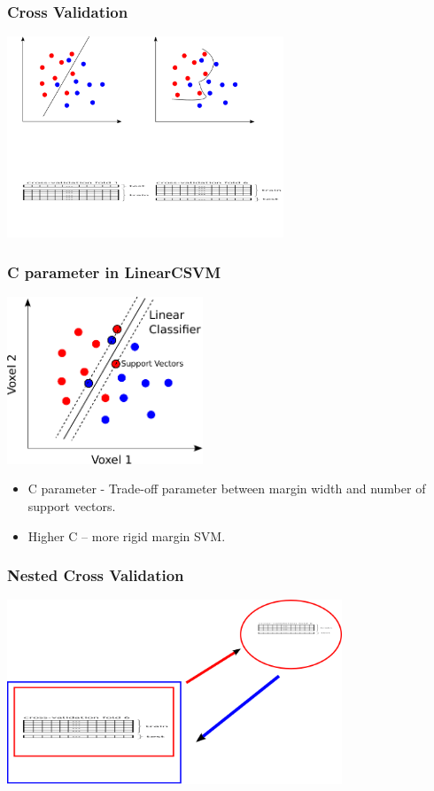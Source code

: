 \documentclass{beamer}
\begin{document}
  \begin{frame}
    \frametitle{Cross Validation}
        \begin{center}
            \includegraphics[height=6cm]{../pictures/cross_validation}
        \end{center}
    \end{frame}    

  \begin{frame}
    \frametitle{C parameter in LinearCSVM}
        \begin{center}
            \includegraphics[height=5cm]{../pictures/margin_support_vectors}
            \begin{itemize}
             \item C parameter - Trade-off parameter between margin width and number of support vectors.
             \item Higher C – more rigid margin SVM.
            \end{itemize}  
        \end{center}     
    \end{frame}   

  \begin{frame}
    \frametitle{Nested Cross Validation}
        \begin{center}
            \includegraphics[height=5.5cm]{../pictures/nested_validation}
        \end{center}     
    \end{frame}  
\end{document}
